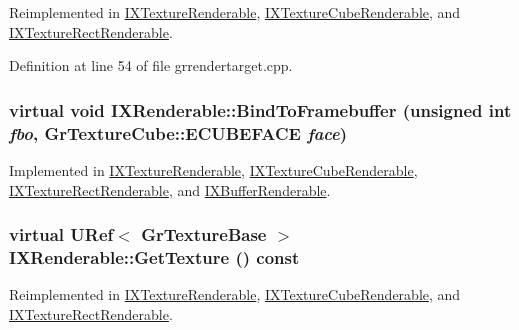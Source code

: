 \begin{CompactItemize}
Reimplemented in \hyperlink{class_i_x_texture_renderable_192d19327613117b701f34a46025d028}{IXTextureRenderable}, \hyperlink{class_i_x_texture_cube_renderable_a3eac9a1a8de19d222ca98549a6f655f}{IXTextureCubeRenderable}, and \hyperlink{class_i_x_texture_rect_renderable_3f97d83058590ba5fc2f5f213931fcf1}{IXTextureRectRenderable}.

Definition at line 54 of file grrendertarget.cpp.\hypertarget{class_i_x_renderable_c5ea40caedef9885429ab5c7dccb0163}{
\subsubsection[{BindToFramebuffer}]{\setlength{\rightskip}{0pt plus 5cm}virtual void IXRenderable::BindToFramebuffer (unsigned int {\em fbo}, \/  {\bf GrTextureCube::ECUBEFACE} {\em face})}}
\label{class_i_x_renderable_c5ea40caedef9885429ab5c7dccb0163}




Implemented in \hyperlink{class_i_x_texture_renderable_79cbe96edff769e27c5dbbcb1defdd2d}{IXTextureRenderable}, \hyperlink{class_i_x_texture_cube_renderable_01b1752841e74a9aa60229c855abcbac}{IXTextureCubeRenderable}, \hyperlink{class_i_x_texture_rect_renderable_0a40ad04c48447177dfda83ff287474a}{IXTextureRectRenderable}, and \hyperlink{class_i_x_buffer_renderable_87a8640a85c1d83ac4339a3d54897432}{IXBufferRenderable}.\hypertarget{class_i_x_renderable_2a74a8b8f702af0557134858ec263aea}{
\subsubsection[{GetTexture}]{\setlength{\rightskip}{0pt plus 5cm}virtual {\bf URef}$<$ {\bf GrTextureBase} $>$ IXRenderable::GetTexture () const}}
\label{class_i_x_renderable_2a74a8b8f702af0557134858ec263aea}




Reimplemented in \hyperlink{class_i_x_texture_renderable_360a1f72f8781be9af2d9616b006ee31}{IXTextureRenderable}, \hyperlink{class_i_x_texture_cube_renderable_35c6be6d9d46593905c7bc41925115a5}{IXTextureCubeRenderable}, and \hyperlink{class_i_x_texture_rect_renderable_b257ec75b2b8544f82d4396f3d84a49a}{IXTextureRectRenderable}.


\end{CompactItemize}
